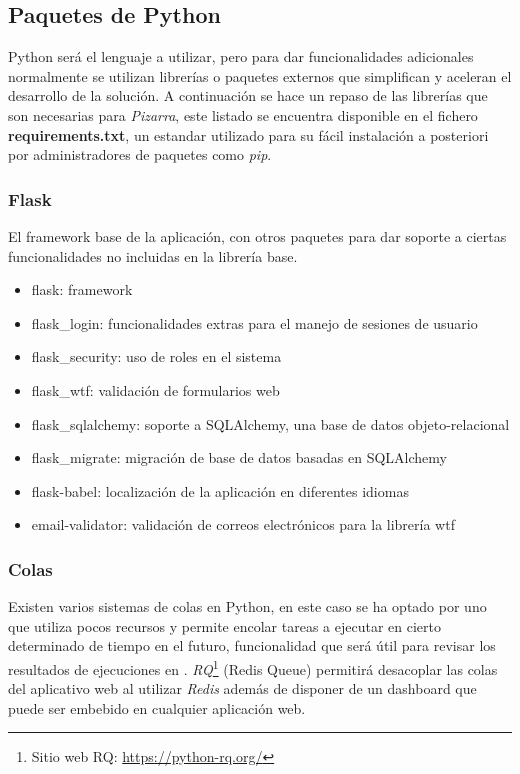 \documentclass[11pt,spanish,listoffigures,listoftables]{tfgetsinf}
\begin{document}
\subsection{Paquetes de Python}

Python será el lenguaje a utilizar, pero para dar funcionalidades adicionales normalmente se utilizan librerías o \Gls{paquete}s externos que simplifican y aceleran el desarrollo de la solución. A continuación se hace un repaso de las librerías que son necesarias para \textit{Pizarra}, este listado se encuentra disponible en el fichero \textbf{requirements.txt}, un estandar utilizado para su fácil instalación a posteriori por administradores de paquetes como \textit{pip}.
	
\subsubsection{Flask}

El framework base de la aplicación, con otros \Gls{paquete}s para dar soporte a ciertas funcionalidades no incluidas en la librería base.

\begin{itemize}
	\item flask: framework
	\item flask\_login: funcionalidades extras para el manejo de sesiones de usuario
	\item flask\_security: uso de roles en el sistema  
	\item flask\_wtf: validación de formularios web
	\item flask\_sqlalchemy: soporte a SQLAlchemy, una base de datos objeto-relacional 
	\item flask\_migrate: migración de base de datos basadas en SQLAlchemy
	\item flask-babel: localización de la aplicación en diferentes idiomas
	\item email-validator: validación de correos electrónicos para la librería wtf
\end{itemize}

\subsubsection{Colas}

Existen varios sistemas de \Gls{cola}s en Python, en este caso se ha optado por uno que utiliza pocos recursos y permite encolar tareas a ejecutar en cierto determinado de tiempo en el futuro, funcionalidad que será útil para revisar los resultados de ejecuciones en \kahan. \textit{RQ}\footnote{Sitio web RQ: \url{https://python-rq.org/}} (Redis Queue) permitirá desacoplar las colas del aplicativo web al utilizar \textit{Redis} además de disponer de un \foreignlanguage{english}{dashboard} que puede ser embebido en cualquier aplicación web.
\end{document}

